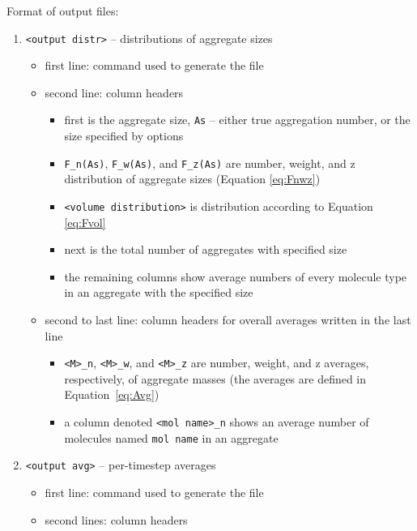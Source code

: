 \noindent
Format of output files:
\begin{enumerate}[nosep,leftmargin=20pt]
  \item \texttt{<output distr>} -- distributions of aggregate sizes
    \begin{itemize}[nosep,leftmargin=5pt]
      \item first line: command used to generate the file
      \item second line: column headers
        \begin{itemize}[nosep,leftmargin=10pt]
          \item first is the aggregate size, \texttt{As} -- either true aggregation
            number, or the size specified by options
          \item \texttt{F\_n(As)}, \texttt{F\_w(As)}, and \texttt{F\_z(As)} are
            number, weight, and z distribution of aggregate sizes (Equation
            \eqref{eq:Fnwz})
          \item \texttt{<volume distribution>} is distribution according
            to Equation \eqref{eq:Fvol}
          \item next is the total number of aggregates with specified size
          \item the remaining columns show average numbers of every molecule
            type in an aggregate with the specified size
        \end{itemize}
      \item second to last line: column headers for overall averages
        written in the last line
        \begin{itemize}[nosep,leftmargin=10pt]
          \item \texttt{<M>\_n}, \texttt{<M>\_w}, and \texttt{<M>\_z} are
            number, weight, and z averages, respectively, of aggregate
            masses (the averages are defined in Equation~\eqref{eq:Avg})
          \item a column denoted \texttt{<mol name>\_n} shows an average
            number of molecules named \texttt{mol name} in an aggregate
        \end{itemize}
    \end{itemize}
  \item \texttt{<output avg>} -- per-timestep averages
  \begin{itemize}[nosep,leftmargin=5pt]
    \item first line: command used to generate the file
    \item second lines: column headers

\end{itemize}
\end{enumerate}
